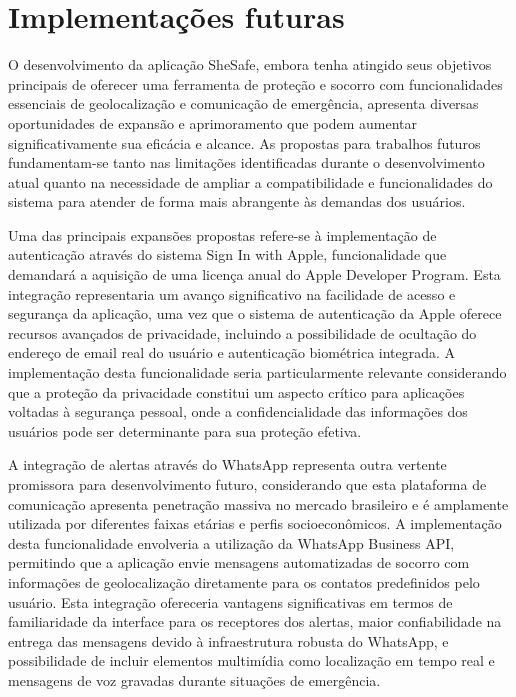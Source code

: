\chapter{Implementações futuras}

O desenvolvimento da aplicação SheSafe, embora tenha atingido seus objetivos principais de oferecer uma ferramenta de proteção e socorro com funcionalidades essenciais de geolocalização e comunicação de emergência, apresenta diversas oportunidades de expansão e aprimoramento que podem aumentar significativamente sua eficácia e alcance. As propostas para trabalhos futuros fundamentam-se tanto nas limitações identificadas durante o desenvolvimento atual quanto na necessidade de ampliar a compatibilidade e funcionalidades do sistema para atender de forma mais abrangente às demandas dos usuários.

Uma das principais expansões propostas refere-se à implementação de autenticação através do sistema Sign In with Apple, funcionalidade que demandará a aquisição de uma licença anual do Apple Developer Program. Esta integração representaria um avanço significativo na facilidade de acesso e segurança da aplicação, uma vez que o sistema de autenticação da Apple oferece recursos avançados de privacidade, incluindo a possibilidade de ocultação do endereço de email real do usuário e autenticação biométrica integrada. A implementação desta funcionalidade seria particularmente relevante considerando que a proteção da privacidade constitui um aspecto crítico para aplicações voltadas à segurança pessoal, onde a confidencialidade das informações dos usuários pode ser determinante para sua proteção efetiva.

A integração de alertas através do WhatsApp representa outra vertente promissora para desenvolvimento futuro, considerando que esta plataforma de comunicação apresenta penetração massiva no mercado brasileiro e é amplamente utilizada por diferentes faixas etárias e perfis socioeconômicos. A implementação desta funcionalidade envolveria a utilização da WhatsApp Business API, permitindo que a aplicação envie mensagens automatizadas de socorro com informações de geolocalização diretamente para os contatos predefinidos pelo usuário. Esta integração ofereceria vantagens significativas em termos de familiaridade da interface para os receptores dos alertas, maior confiabilidade na entrega das mensagens devido à infraestrutura robusta do WhatsApp, e possibilidade de incluir elementos multimídia como localização em tempo real e mensagens de voz gravadas durante situações de emergência.

